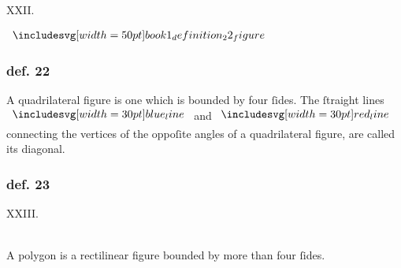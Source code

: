 \hfill

\begin{center}
    XXII.\label{book1def22}\\
\end{center}
\begin{minipage}{0.33\textwidth}
    \begin{center}
        $\img[0][0][50]{book1_definition_22_figure}$
    \end{center}
\end{minipage}%
\begin{minipage}{0.67\textwidth}
    \subsubsection{def. 22}
    \begin{center}
        \raggedright A quadrilateral figure is one which is bounded by four ſides. The ſtraight lines $\blueline$ and $\redline$ connecting the vertices of the oppoſite angles of a quadrilateral figure, are called its diagonal.
    \end{center}
\end{minipage}

\hfill

\begin{minipage}{0.165\textwidth}
    \phantom{}
\end{minipage}%
\begin{minipage}{0.67\textwidth}
    \subsubsection{def. 23}
    \begin{center}
        XXIII.\label{book1def23}\\
        \hfill\\
        \raggedright A polygon is a rectilinear figure bounded by more than four ſides.\\
    \end{center}
\end{minipage}%
\begin{minipage}{0.165\textwidth}
    \phantom{}
\end{minipage}%

\hfill

